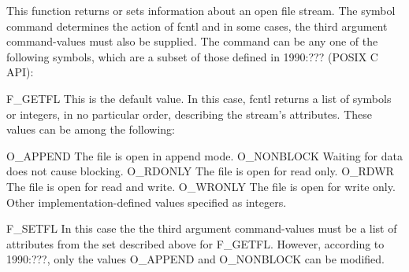 \begin{optPrivate}
This function returns or sets information about an open file stream. The symbol
command determines the action of fcntl and in some cases, the third argument
command-values must also be supplied. The command can be any one of the
following symbols, which are a subset of those defined in 1990:??? (POSIX C
API):

F_GETFL
This is the default value. In this case, fcntl returns a list of symbols or
integers, in no particular order, describing the stream's attributes. These
values can be among the following:

O_APPEND
The file is open in append mode.
O_NONBLOCK
Waiting for data does not cause blocking.
O_RDONLY
The file is open for read only.
O_RDWR
The file is open for read and write.
O_WRONLY
The file is open for write only.
Other implementation-defined values specified as integers.

F_SETFL
In this case the the third argument command-values must be a list of
attributes from the set described above for F_GETFL. However, according to
1990:???, only the values O_APPEND and O_NONBLOCK can be modified.
\end{optPrivate}

